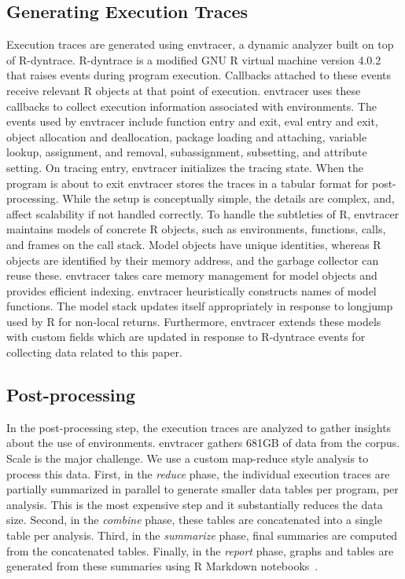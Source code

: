 \documentclass[10pt,review,sigplan,anonymous=true,authorversion=true,nonacm=true]{acmart}
\newcommand{\envtracer}{{\sf envtracer}\xspace}
\newcommand{\rdyntrace}{{\sf R-dyntrace}\xspace}
\begin{document}
\subsection{Generating Execution Traces}

Execution traces are generated using \envtracer, a dynamic analyzer built on top
of \rdyntrace. \rdyntrace is a modified GNU R virtual machine version
4.0.2~\cite{oopsla19b} that raises events during program execution. Callbacks
attached to these events receive relevant R objects at that point of execution.
\envtracer uses these callbacks to collect execution information associated with
environments. The events used by \envtracer include function entry and exit,
eval entry and exit, object allocation and deallocation, package loading and
attaching, variable lookup, assignment, and removal, subassignment, subsetting,
and attribute setting. On tracing entry, \envtracer initializes the tracing
state. When the program is about to exit \envtracer stores the traces in a
tabular format for post-processing. While the setup is conceptually simple, the
details are complex, and, affect scalability if not handled correctly. To handle
the subtleties of R, \envtracer maintains models of concrete R objects, such as
environments, functions, calls, and frames on the call stack. Model objects have
unique identities, whereas R objects are identified by their memory address, and
the garbage collector can reuse these. \envtracer takes care memory management
for model objects and provides efficient indexing. \envtracer heuristically
constructs names of model functions. The model stack updates itself
appropriately in response to longjump used by R for non-local returns.
Furthermore, \envtracer extends these models with custom fields which are
updated in response to \rdyntrace events for collecting data related to this
paper.

\subsection{Post-processing}
In the post-processing step, the execution traces are analyzed to gather
insights about the use of environments. \envtracer gathers 681GB of data from
the corpus. Scale is the major challenge. We use a custom map-reduce style
analysis to process this data. First, in the \textit{reduce} phase, the
individual execution traces are partially summarized in parallel to generate
smaller data tables per program, per analysis. This is the most expensive step
and it substantially reduces the data size. Second, in the \textit{combine}
phase, these tables are concatenated into a single table per analysis. Third, in
the \textit{summarize} phase, final summaries are computed from the concatenated
tables. Finally, in the \textit{report} phase, graphs and tables are generated
from these summaries using R Markdown notebooks~\cite{rmdpkg}.
\end{document}
